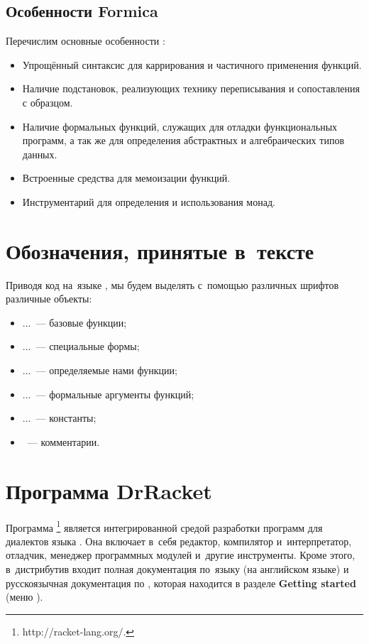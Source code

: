 \subsection{Особенности Formica}%
Перечислим основные особенности \FLP:

\begin{itemize}
  \item Упрощённый синтаксис для каррирования и частичного применения функций.
  \item Наличие подстановок, реализующих технику переписывания и сопоставления с образцом.
  \item Наличие формальных функций, служащих для отладки функциональных программ, 
  а так же для определения абстрактных и алгебраических типов данных.
  \item Встроенные средства для мемоизации функций.
  \item Инструментарий для определения и использования монад.
\end{itemize}

\section{Обозначения, принятые в~тексте}%
Приводя код на~языке \Scheme, мы будем выделять с~помощью различных шрифтов различные объекты:

\begin{itemize}[\ ]
  \item {} ...~--- базовые функции; 
  \item {} ...~--- специальные формы;
  \item {} ...~--- определяемые нами функции;
  \item {} ...~--- формальные аргументы функций;
  \item {} ...~--- константы;
  \item {}~--- комментарии.
\end{itemize}

\section[2]{Программа DrRacket}%
Программа \footnote{http://racket-lang.org/.} является интегрированной средой разработки программ для диалектов языка . Она включает в~себя редактор, компилятор и~интерпретатор, отладчик, менеджер программных модулей и~другие инструменты. Кроме этого, в~дистрибутив входит полная документация по~языку \Racket (на английском языке) и русскоязычная документация по \Scheme, которая находится в разделе \textbf{Getting started} (меню ).

